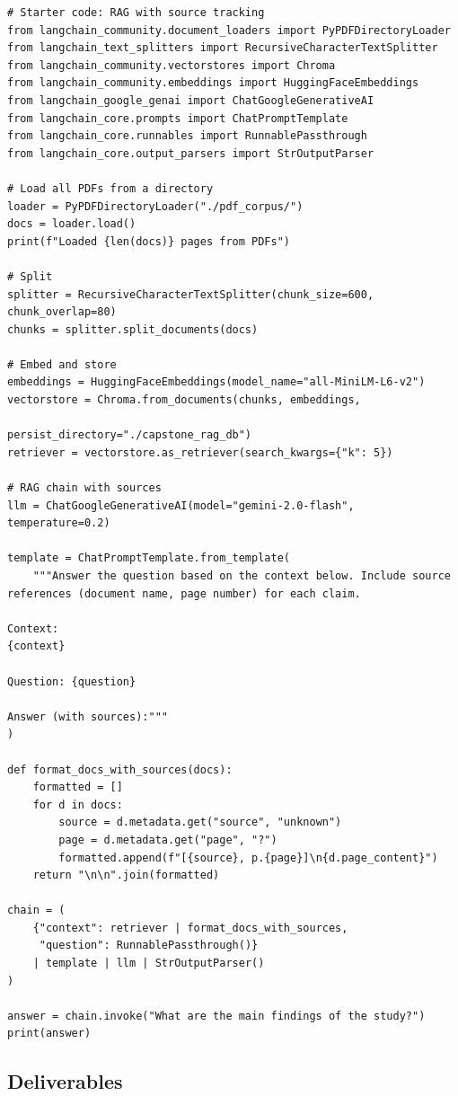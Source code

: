 \begin{verbatim}
# Starter code: RAG with source tracking
from langchain_community.document_loaders import PyPDFDirectoryLoader
from langchain_text_splitters import RecursiveCharacterTextSplitter
from langchain_community.vectorstores import Chroma
from langchain_community.embeddings import HuggingFaceEmbeddings
from langchain_google_genai import ChatGoogleGenerativeAI
from langchain_core.prompts import ChatPromptTemplate
from langchain_core.runnables import RunnablePassthrough
from langchain_core.output_parsers import StrOutputParser

# Load all PDFs from a directory
loader = PyPDFDirectoryLoader("./pdf_corpus/")
docs = loader.load()
print(f"Loaded {len(docs)} pages from PDFs")

# Split
splitter = RecursiveCharacterTextSplitter(chunk_size=600, chunk_overlap=80)
chunks = splitter.split_documents(docs)

# Embed and store
embeddings = HuggingFaceEmbeddings(model_name="all-MiniLM-L6-v2")
vectorstore = Chroma.from_documents(chunks, embeddings,
                                     persist_directory="./capstone_rag_db")
retriever = vectorstore.as_retriever(search_kwargs={"k": 5})

# RAG chain with sources
llm = ChatGoogleGenerativeAI(model="gemini-2.0-flash", temperature=0.2)

template = ChatPromptTemplate.from_template(
    """Answer the question based on the context below. Include source
references (document name, page number) for each claim.

Context:
{context}

Question: {question}

Answer (with sources):"""
)

def format_docs_with_sources(docs):
    formatted = []
    for d in docs:
        source = d.metadata.get("source", "unknown")
        page = d.metadata.get("page", "?")
        formatted.append(f"[{source}, p.{page}]\n{d.page_content}")
    return "\n\n".join(formatted)

chain = (
    {"context": retriever | format_docs_with_sources,
     "question": RunnablePassthrough()}
    | template | llm | StrOutputParser()
)

answer = chain.invoke("What are the main findings of the study?")
print(answer)
\end{verbatim}

\subsection{Deliverables}

